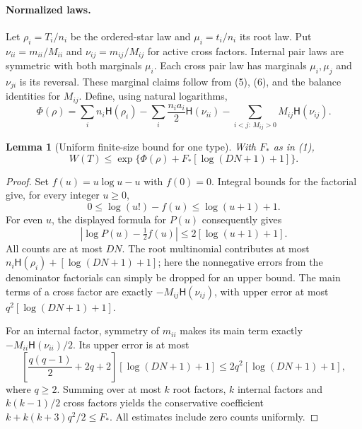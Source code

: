 \documentclass[11pt]{article}
\newtheorem{lemma}{Lemma}
\newcommand{\HH}{\mathsf H}
\begin{document}
\paragraph{Normalized laws.}
Let $\rho_i=T_i/n_i$ be the ordered-star law and $\mu_i=t_i/n_i$ its
root law. Put $\nu_{ii}=m_{ii}/M_{ii}$ and
$\nu_{ij}=m_{ij}/M_{ij}$ for active cross factors. Internal pair laws
are symmetric with both marginals $\mu_i$. Each cross pair law has
marginals $\mu_i,\mu_j$ and $\nu_{ji}$ is its reversal. These marginal
claims follow from (5), (6), and the balance identities for $M_{ij}$.
Define, using natural logarithms,
\[
 \Phi(\rho)=\sum_i n_i\HH(\rho_i)
 -\sum_i\frac{n_i a_i}{2}\HH(\nu_{ii})
 -\sum_{i<j:\,M_{ij}>0}M_{ij}\HH(\nu_{ij}).           \tag{8}
\]

\begin{lemma}[Uniform finite-size bound for one type]
With $F_*$ as in (1),
\[
 W(T)\leq\exp\{\Phi(\rho)+F_*[\log(DN+1)+1]\}.      \tag{9}
\]
\end{lemma}
\begin{proof}
Set $f(u)=u\log u-u$ with $f(0)=0$. Integral bounds for the factorial
give, for every integer $u\geq0$,
\[
 0\leq\log(u!)-f(u)\leq\log(u+1)+1.
\]
For even $u$, the displayed formula for $P(u)$ consequently gives
\[
 |\log P(u)-\tfrac12f(u)|\leq2[\log(u+1)+1].
\]
All counts are at most $DN$. The root multinomial contributes at most
$n_i\HH(\rho_i)+[\log(DN+1)+1]$; here the nonnegative errors from
the denominator factorials can simply be dropped for an upper bound.
The main terms of a cross factor are exactly
$-M_{ij}\HH(\nu_{ij})$, with upper error at most
$q^2[\log(DN+1)+1]$.

For an internal factor, symmetry of $m_{ii}$ makes its main term exactly
$-M_{ii}\HH(\nu_{ii})/2$. Its upper error is at most
\[
 \left[\frac{q(q-1)}2+2q+2\right][\log(DN+1)+1]
 \leq2q^2[\log(DN+1)+1],
\]
where $q\geq2$. Summing over at most $k$ root factors, $k$ internal
factors and $k(k-1)/2$ cross factors yields the conservative coefficient
$k+k(k+3)q^2/2\leq F_*$. All estimates include zero counts uniformly.
\end{proof}
\end{document}

